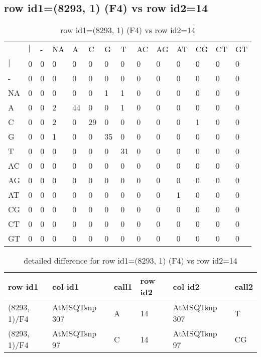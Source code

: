 \subsection{row id1=(8293, 1) (F4) vs row id2=14}
\begin{center}
\begin{longtable}{|l|l|l|l|l|l|l|l|l|l|l|l|l|l|}
\caption{row id1=(8293, 1) (F4) vs row id2=14} \label{table_dm460}\\
\hline
\\
\hline
&$|$&-&NA&A&C&G&T&AC&AG&AT&CG&CT&GT\\
$|$&0&0&0&0&0&0&0&0&0&0&0&0&0\\
-&0&0&0&0&0&0&0&0&0&0&0&0&0\\
NA&0&0&0&0&0&1&1&0&0&0&0&0&0\\
A&0&0&2&44&0&0&1&0&0&0&0&0&0\\
C&0&0&2&0&29&0&0&0&0&0&1&0&0\\
G&0&0&1&0&0&35&0&0&0&0&0&0&0\\
T&0&0&0&0&0&0&31&0&0&0&0&0&0\\
AC&0&0&0&0&0&0&0&0&0&0&0&0&0\\
AG&0&0&0&0&0&0&0&0&0&0&0&0&0\\
AT&0&0&0&0&0&0&0&0&0&1&0&0&0\\
CG&0&0&0&0&0&0&0&0&0&0&0&0&0\\
CT&0&0&0&0&0&0&0&0&0&0&0&0&0\\
GT&0&0&0&0&0&0&0&0&0&0&0&0&0\\
\hline
\end{longtable}
\end{center}

\begin{center}
\begin{longtable}{|l|l|l|l|l|l|}
\caption{detailed difference for row id1=(8293, 1) (F4) vs row id2=14} \label{table_dm461}\\
\hline
row id1&col id1&call1&row id2&col id2&call2\\
\hline
(8293, 1)/F4&AtMSQTsnp 307&A&14&AtMSQTsnp 307&T\\
(8293, 1)/F4&AtMSQTsnp 97&C&14&AtMSQTsnp 97&CG\\
\hline
\end{longtable}
\end{center}

